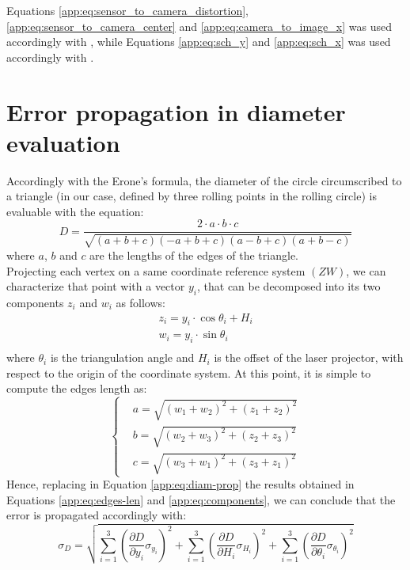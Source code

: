 Equations \ref{app:eq:sensor_to_camera_distortion}, \ref{app:eq:sensor_to_camera_center} and \ref{app:eq:camera_to_image_x} was used accordingly with \cite{TsaiTvLenses}, while Equations \ref{app:eq:sch_y} and \ref{app:eq:sch_x} was used accordingly with \cite{SchCameraCalib}.

\section*{Error propagation in diameter evaluation}
Accordingly with the Erone's formula, the diameter of the circle circumscribed to a triangle (in our case, defined by three rolling points in the rolling circle) is evaluable with the equation:
  \begin{equation}
    D = \frac{2\cdot a\cdot b\cdot c}{\sqrt{( a + b + c )( - a + b + c )( a - b + c )( a + b - c )}}
    \label{app:eq:diam-prop}
  \end{equation}
where $a$, $b$ and $c$ are the lengths of the edges of the triangle. \\

Projecting each vertex on a same coordinate reference system $(ZW)$, we can characterize that point with a vector $y_i$, that can be decomposed into its two components $z_i$ and $w_i$ as follows:
  \begin{equation}
    \begin{matrix}
      z_i = y_i \cdot \cos \theta_i + H_i \\
      w_i = y_i \cdot \sin \theta_i \\
    \end{matrix}
    \label{app:eq:components}
  \end{equation}
where $\theta_i$ is the triangulation angle and $H_i$ is the offset of the laser projector, with respect to the origin of the coordinate system. At this point, it is simple to compute the edges length as:
  \begin{equation}
    \left\{
    \begin{matrix} 
      & a = \sqrt{(w_1 + w_2)^2 + (z_1 + z_2)^2} \\
      & b = \sqrt{(w_2 + w_3)^2 + (z_2 + z_3)^2} \\
      & c = \sqrt{(w_3 + w_1)^2 + (z_3 + z_1)^2}
    \end{matrix}
    \right.
    \label{app:eq:edges-len}
  \end{equation}
Hence, replacing in Equation \ref{app:eq:diam-prop} the results obtained in Equations \ref{app:eq:edges-len} and \ref{app:eq:components}, we can conclude that the error is propagated accordingly with:
  \begin{equation*}
    \sigma_D = \sqrt{
      \sum_{i = 1}^3 \left( \frac{\partial D}{\partial y_i} \sigma_{y_i} \right)^2 + 
      \sum_{i = 1}^3 \left( \frac{\partial D}{\partial H_i} \sigma_{H_i} \right)^2 + 
      \sum_{i = 1}^3 \left( \frac{\partial D}{\partial \theta_i} \sigma_{\theta_i} \right)^2
    }
  \end{equation*} \\

